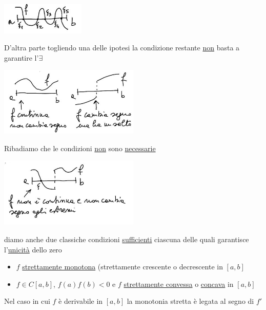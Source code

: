 \documentclass[12pt]{article}
\begin{document}
\begin{center}
        \includegraphics[width=0.3\textwidth]{2.JPG}\par
\end{center}
D'altra parte togliendo una delle ipotesi la condizione restante \underline{non} basta a garantire l'$\exists$
\begin{center}
        \includegraphics[width=0.5\textwidth]{3.JPG}\par
\end{center}
Ribadiamo che le condizioni \underline{non} sono \underline{necessarie}
\begin{center}
            \includegraphics[width=0.5\textwidth]{4.JPG}\par
\end{center}
diamo anche due classiche condizioni \underline{sufficienti} ciascuna delle quali garantisce l'\underline{unicità} dello zero
\begin{itemize}
    \item $f$ \underline{strettamente monotona} (strettamente crescente o decrescente in $[a,b]$
    \item $f \in C[a,b]$, $f(a)f(b)<0$ e $f$ \underline{strettamente convessa} o \underline{concava} in $[a,b]$
\end{itemize}
Nel caso in cui $f$ è derivabile in $[a,b]$ la monotonia stretta è legata al segno di $f'$
\end{document}
